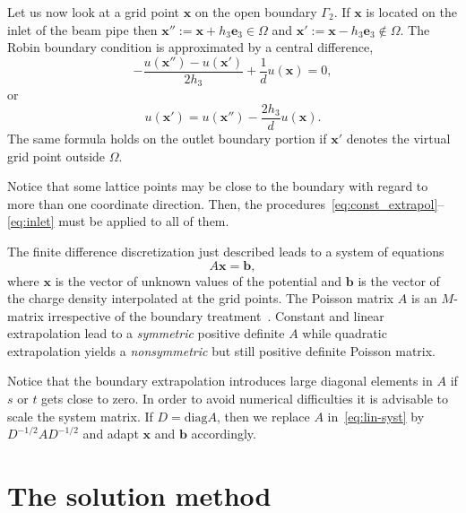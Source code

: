 \documentclass[a4paper,10pt,3p,preprint,pdftex]{elsarticle}
\begin{document}
Let us now look at a grid point $\mathbf{x}$ on the open boundary
$\Gamma_2$.  If $\mathbf{x}$ is located on the inlet of the beam pipe
then $\mathbf{x}'':=\mathbf{x}\! +\! h_3\mathbf{e}_3 \in \Omega$ and
$\mathbf{x}':=\mathbf{x}\! -\! h_3\mathbf{e}_3 \not\in \Omega$.  The
Robin boundary condition is approximated by a central difference,
\begin{displaymath}
  - \frac{u(\mathbf{x}'') - u(\mathbf{x}')}{2h_3}
  + \frac{1}{d}u(\mathbf{x}) = 0,
\end{displaymath}
or
\begin{equation}  \label{eq:inlet}
  u(\mathbf{x}') = u(\mathbf{x}'') - \frac{2h_3}{d}u(\mathbf{x}).
\end{equation}
The same formula holds on the outlet boundary portion if $\mathbf{x}'$
denotes the virtual grid point outside $\Omega$.

Notice that some lattice points may be close to the boundary with regard
to more than one coordinate direction.  Then, the
procedures~\eqref{eq:const_extrapol}--\eqref{eq:inlet} must be
applied to all of them.  

The finite difference discretization just described leads to a system of
equations
\begin{equation} \label{eq:lin-syst}
  A \mathbf{x} = \mathbf{b},
\end{equation}
where $\mathbf{x}$ is the vector of unknown values of the potential and
$\mathbf{b}$ is the vector of the charge density interpolated at the grid
points.
The Poisson matrix $A$ is an $M$-matrix irrespective of the boundary
treatment~\cite{hack:94}.  Constant and linear extrapolation lead to a
\emph{symmetric} positive definite $A$ while quadratic extrapolation
yields a \emph{nonsymmetric} but still positive definite Poisson matrix.

Notice that the boundary extrapolation introduces large diagonal
elements in $A$ if $s$ or $t$ gets close to zero.  In order to avoid
numerical difficulties it is advisable to scale the system matrix.  If
$D = \mbox{diag}{A}$, then we replace $A$ in~\eqref{eq:lin-syst} by
$D^{-1/2} A D^{-1/2}$ and adapt $\mathbf{x}$ and $\mathbf{b}$
accordingly.  




%
\section{The solution method}
\label{sec:method}
\end{document}
